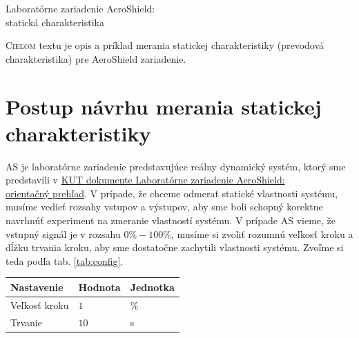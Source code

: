 \documentclass[a4paper, 10pt, ]{article}
\begin{document}
\begin{flushleft}
    Laboratórne zariadenie AeroShield:\\ statická charakteristika
\end{flushleft}

\bigskip

\normalsize
\normalfont

\lstset{style=mystyle}










\noindent
\lettrine[lines=1, nindent=1pt, loversize=0.0]{C}{ieľom}
textu je opis a príklad merania statickej charakteristiky (prevodová charakteristika) pre AeroShield zariadenie.


\section{Postup návrhu merania statickej charakteristiky}

AS je laboratórne zariadenie predstavujúce reálny dynamický systém, ktorý sme predstavili v \href{run:../../KUTdev_AeroShield_Info/TeX/KUTdevAS0.pdf}{KUT dokumente Laboratórne zariadenie AeroShield:\\ orientačný prehľad}. V prípade, že chceme odmerať statické vlastnosti systému, musíme vedieť rozsahy vstupov a výstupov, aby sme boli schopný korektne navrhnúť experiment na zmeranie vlastností systému.
V prípade AS vieme, že vstupný signál je v rozsahu $0\% - 100\%$, musíme si zvoliť rozumnú veľkosť kroku a dĺžku trvania kroku, aby sme dostatočne zachytili vlastnosti systému. Zvoľme si teda podľa tab. \ref{tab:config}.

\begin{center}

    \vspace{-10pt}

    \label{tab:config}

    \lstyle

    \begin{tabular*}{\textwidth}{@{ \extracolsep{\fill}} lll}
        \toprule
        Nastavenie & Hodnota & Jednotka \\
        \midrule
        Veľkosť kroku & $1$ & \% \\
        Trvanie & $10$ & s \\
        \bottomrule
    \end{tabular*}

\end{center}
\end{document}
